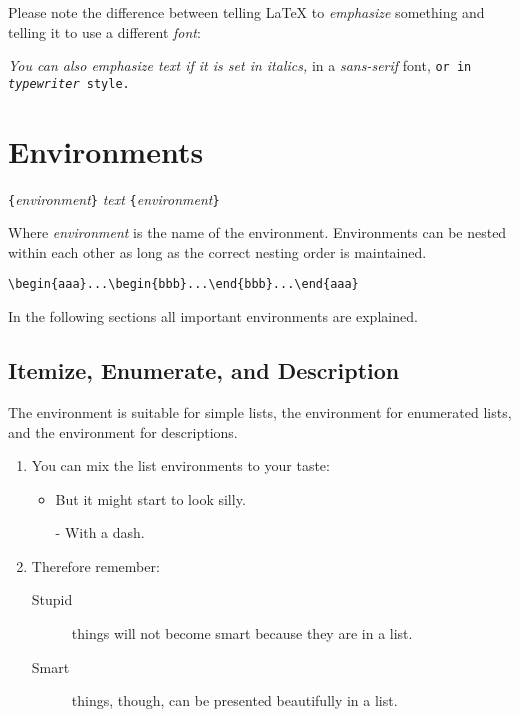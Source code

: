 Please note the difference between telling \LaTeX{} to
\emph{emphasize} something and telling it to use a different
\emph{font}:

\begin{example}
\textit{You can also
  \emph{emphasize} text if 
  it is set in italics,} 
\textsf{in a 
  \emph{sans-serif} font,}
\texttt{or in 
  \emph{typewriter} style.}
\end{example}

\section{Environments} \label{env}

\begin{lscommand}
\verb|{|\emph{environment}\verb|}|\quad
   \emph{text}\quad
{}\verb|{|\emph{environment}\verb|}|
\end{lscommand}
\noindent Where \emph{environment} is the name of the environment. Environments can be
nested within each other as long as the correct nesting order is
maintained.
\begin{code}
\verb|\begin{aaa}...\begin{bbb}...\end{bbb}...\end{aaa}|
\end{code}

\noindent In the following sections all important environments are explained.

\subsection{Itemize, Enumerate, and Description}

The  environment is suitable for simple lists, the
 environment for enumerated lists, and the
 environment for descriptions.

\begin{example}
\flushleft
\begin{enumerate}
\item You can mix the list
environments to your taste:
\begin{itemize}
\item But it might start to
look silly. 
\item[-] With a dash.
\end{itemize}
\item Therefore remember:
\begin{description}
\item[Stupid] things will not
become smart because they are
in a list.
\item[Smart] things, though,
can be presented beautifully
in a list.
\end{description}
\end{enumerate}
\end{example}
 
